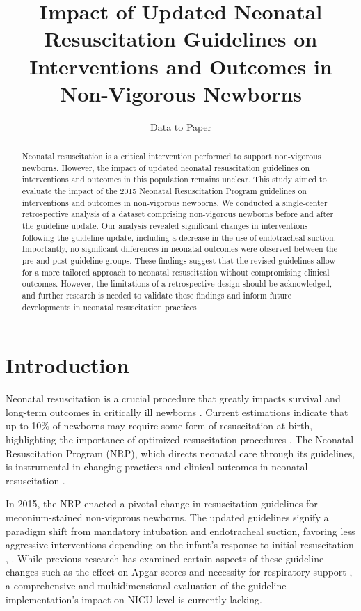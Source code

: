 \documentclass[11pt]{article}
\title{Impact of Updated Neonatal Resuscitation Guidelines on Interventions and Outcomes in Non-Vigorous Newborns}
\author{Data to Paper}
\begin{document}
\maketitle
\begin{abstract}Neonatal resuscitation is a critical intervention performed to support non-vigorous newborns. However, the impact of updated neonatal resuscitation guidelines on interventions and outcomes in this population remains unclear. This study aimed to evaluate the impact of the 2015 Neonatal Resuscitation Program guidelines on interventions and outcomes in non-vigorous newborns. We conducted a single-center retrospective analysis of a dataset comprising non-vigorous newborns before and after the guideline update. Our analysis revealed significant changes in interventions following the guideline update, including a decrease in the use of endotracheal suction. Importantly, no significant differences in neonatal outcomes were observed between the pre and post guideline groups. These findings suggest that the revised guidelines allow for a more tailored approach to neonatal resuscitation without compromising clinical outcomes. However, the limitations of a retrospective design should be acknowledged, and further research is needed to validate these findings and inform future developments in neonatal resuscitation practices.\end{abstract}
\section*{Introduction}

Neonatal resuscitation is a crucial procedure that greatly impacts survival and long-term outcomes in critically ill newborns \cite{Lee2011NeonatalRA}. Current estimations indicate that up to 10\% of newborns may require some form of resuscitation at birth, highlighting the importance of optimized resuscitation procedures \cite{Halamek2008EducationalPT}. The Neonatal Resuscitation Program (NRP), which directs neonatal care through its guidelines, is instrumental in changing practices and clinical outcomes in neonatal resuscitation \cite{Wyckoff2015Part1N}.

In 2015, the NRP enacted a pivotal change in resuscitation guidelines for meconium-stained non-vigorous newborns. The updated guidelines signify a paradigm shift from mandatory intubation and endotracheal suction, favoring less aggressive interventions depending on the infant's response to initial resuscitation \cite{Wyckoff2015Part1N}, \cite{Weiner2022UpdatesFT}. While previous research has examined certain aspects of these guideline changes such as the effect on Apgar scores and necessity for respiratory support \cite{Myers2020ImpactOT}, a comprehensive and multidimensional evaluation of the guideline implementation's impact on NICU-level is currently lacking.
\end{document}
